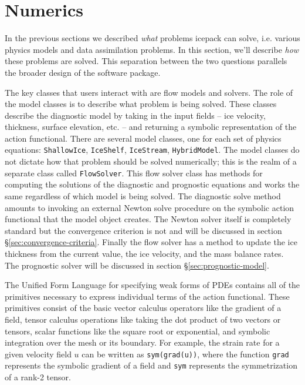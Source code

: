\documentclass{article}
\theoremstyle{definition}
\theoremstyle{plain}
\begin{document}
\section{Numerics}

In the previous sections we described \emph{what} problems icepack can solve, i.e. various physics models and data assimilation problems.
In this section, we'll describe \emph{how} these problems are solved.
This separation between the two questions parallels the broader design of the software package.

The key classes that users interact with are flow models and solvers.
The role of the model classes is to describe what problem is being solved.
These classes describe the diagnostic model by taking in the input fields -- ice velocity, thickness, surface elevation, etc. -- and returning a symbolic representation of the action functional.
There are several model classes, one for each set of physics equations: \texttt{ShallowIce}, \texttt{IceShelf}, \texttt{IceStream}, \texttt{HybridModel}.
The model classes do not dictate how that problem should be solved numerically; this is the realm of a separate class called \texttt{FlowSolver}.
This flow solver class has methods for computing the solutions of the diagnostic and prognostic equations and works the same regardless of which model is being solved.
The diagnostic solve method amounts to invoking an external Newton solve procedure on the symbolic action functional that the model object creates.
The Newton solver itself is completely standard but the convergence criterion is not and will be discussed in section \S\ref{sec:convergence-criteria}.
Finally the flow solver has a method to update the ice thickness from the current value, the ice velocity, and the mass balance rates.
The prognostic solver will be discussed in section \S\ref{sec:prognostic-model}.

The Unified Form Language for specifying weak forms of PDEs contains all of the primitives necessary to express individual terms of the action functional.
These primitives consist of the basic vector calculus operators like the gradient of a field, tensor calculus operations like taking the dot product of two vectors or tensors, scalar functions like the square root or exponential, and symbolic integration over the mesh or its boundary.
For example, the strain rate for a given velocity field $u$ can be written as \texttt{sym(grad(u))}, where the function \texttt{grad} represents the symbolic gradient of a field and \texttt{sym} represents the symmetrization of a rank-2 tensor.
\end{document}
